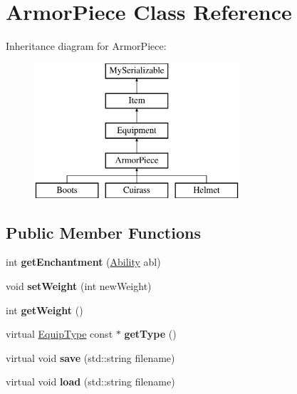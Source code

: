 \hypertarget{class_armor_piece}{}\section{Armor\+Piece Class Reference}
\label{class_armor_piece}
Inheritance diagram for Armor\+Piece\+:\begin{figure}[H]
\begin{center}
\leavevmode
\includegraphics[height=5.000000cm]{class_armor_piece}
\end{center}
\end{figure}
\subsection*{Public Member Functions}
\begin{DoxyCompactItemize}
\item 
\hypertarget{class_armor_piece_a3c4d56ccbd1bb22475cba40c880035bd}{}\label{class_armor_piece_a3c4d56ccbd1bb22475cba40c880035bd} 
int {\bfseries get\+Enchantment} (\hyperlink{class_ability}{Ability} abl)
\item 
\hypertarget{class_armor_piece_a15b22ff2e3958cd099931205382cd1a9}{}\label{class_armor_piece_a15b22ff2e3958cd099931205382cd1a9} 
void {\bfseries set\+Weight} (int new\+Weight)
\item 
\hypertarget{class_armor_piece_a817d88f26d7796118ce4073e716845ab}{}\label{class_armor_piece_a817d88f26d7796118ce4073e716845ab} 
int {\bfseries get\+Weight} ()
\item 
\hypertarget{class_armor_piece_a7069e157bc843765858d5e109879dbc1}{}\label{class_armor_piece_a7069e157bc843765858d5e109879dbc1} 
virtual \hyperlink{class_equip_type}{Equip\+Type} const  $\ast$ {\bfseries get\+Type} ()
\item 
\hypertarget{class_armor_piece_a3de43795bc5a8c7937f69d6200e8a835}{}\label{class_armor_piece_a3de43795bc5a8c7937f69d6200e8a835} 
virtual void {\bfseries save} (std\+::string filename)
\item 
\hypertarget{class_armor_piece_abd9ac9f9b06c808262dea7af7cfca90e}{}\label{class_armor_piece_abd9ac9f9b06c808262dea7af7cfca90e} 
virtual void {\bfseries load} (std\+::string filename)
\end{DoxyCompactItemize}
